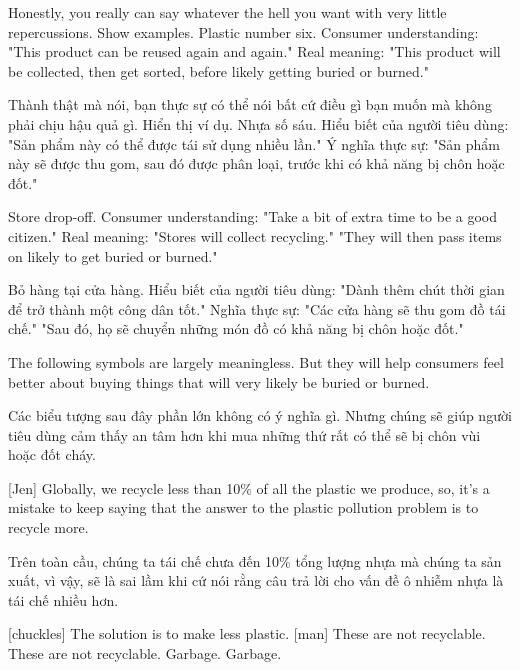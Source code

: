 \documentclass[a4paper]{article}
\begin{document}
	Honestly, you really can say whatever the hell you want with very little repercussions.
	Show examples.
	Plastic number six.
	Consumer understanding:
	"This product can be reused again and again." Real meaning: "This product will be collected, then get sorted, before likely getting buried or burned."
	
	\begin{vietnamese-v2}
		Thành thật mà nói, bạn thực sự có thể nói bất cứ điều gì bạn muốn mà không phải chịu hậu quả gì.
		Hiển thị ví dụ.
		Nhựa số sáu.
		Hiểu biết của người tiêu dùng:
		"Sản phẩm này có thể được tái sử dụng nhiều lần." Ý nghĩa thực sự: "Sản phẩm này sẽ được thu gom, sau đó được phân loại, trước khi có khả năng bị chôn hoặc đốt."
	\end{vietnamese-v2}
	
	Store drop-off.
	Consumer understanding: "Take a bit of extra time to be a good citizen."
	Real meaning: "Stores will collect recycling."
	"They will then pass items on likely to get buried or burned."
	
	\begin{vietnamese-v2}
		Bỏ hàng tại cửa hàng.
		Hiểu biết của người tiêu dùng: "Dành thêm chút thời gian để trở thành một công dân tốt."
		Nghĩa thực sự: "Các cửa hàng sẽ thu gom đồ tái chế."
		"Sau đó, họ sẽ chuyển những món đồ có khả năng bị chôn hoặc đốt."
	\end{vietnamese-v2}
	
	The following symbols are largely meaningless.
	But they will help consumers feel better about buying things that will very likely be buried or burned.
	
	\begin{vietnamese-v2}
		Các biểu tượng sau đây phần lớn không có ý nghĩa gì.
		Nhưng chúng sẽ giúp người tiêu dùng cảm thấy an tâm hơn khi mua những thứ rất có thể sẽ bị chôn vùi hoặc đốt cháy.
	\end{vietnamese-v2}
	
	[Jen] Globally, we recycle less than 10\% of all the plastic we produce, so, it's a mistake to keep saying that the answer to the plastic pollution problem is to recycle more.
	
	\begin{vietnamese-v2}
		[Jen] Trên toàn cầu, chúng ta tái chế chưa đến 10\% tổng lượng nhựa mà chúng ta sản xuất, vì vậy, sẽ là sai lầm khi cứ nói rằng câu trả lời cho vấn đề ô nhiễm nhựa là tái chế nhiều hơn.
	\end{vietnamese-v2}
	
	[chuckles] The solution is to make less plastic.
	[man] These are not recyclable.
	These are not recyclable. Garbage. Garbage.
	
\end{document}
